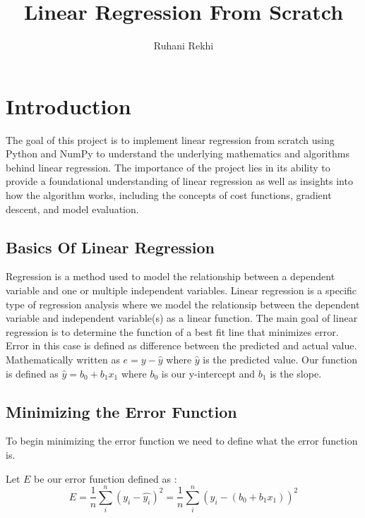 \documentclass{article}
\title{Linear Regression From Scratch}
\author{Ruhani Rekhi}
\begin{document}
\maketitle


\section{Introduction}

The goal of this project is to implement linear regression from scratch using Python and NumPy to understand the underlying mathematics and algorithms behind linear regression.
The importance of the project lies in its ability to provide a foundational understanding of linear regression as well as insights into how the algorithm works, including the concepts of cost functions, gradient descent, and model evaluation.


\subsection{Basics Of Linear Regression}
Regression is a method used to model the relationship between a dependent variable and one or multiple independent variables. Linear regression is a specific type of regression analysis where we model the relationsip between the dependent variable and independent variable(s) as a linear function.
The main goal of linear regression is to determine the function of a best fit line that minimizes error. Error in this case is defined as difference between the predicted and actual value. Mathematically written as $ e = y - \hat{y}  $ where $\hat{y}$ is the predicted value. Our function is defined as $ \hat{y} = b_0 + b_1x_1 $ where $b_0$ is our y-intercept and $b_1$ is the slope. 

\subsection{Minimizing the Error Function}

To begin minimizing the error function we need to define what the error function is. 

Let $E$ be our error function defined as :
\[E = \frac{1}{n} \sum_{i}^{n}(y_i - \hat{y_i})^2
    = \frac{1}{n} \sum_{i}^{n}(y_i - (b_0 + b_1x_1))^2
\]
\end{document}
